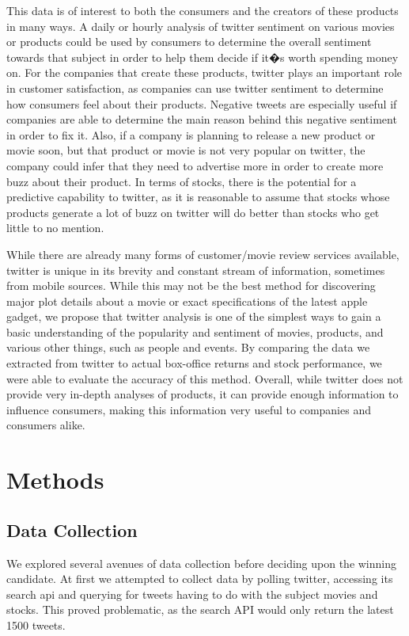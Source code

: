 \documentclass[11pt]{article}
\begin{document}
This data is of interest to both the consumers and the creators of these products in many ways.  A daily or hourly analysis of twitter sentiment on various movies or products could be used by consumers to determine the overall sentiment towards that subject in order to help them decide if it�s worth spending money on.  For the companies that create these products, twitter plays an important role in customer satisfaction, as companies can use twitter sentiment to determine how consumers feel about their products.  Negative tweets are especially useful if companies are able to determine the main reason behind this negative sentiment in order to fix it.  Also, if a company is planning to release a new product or movie soon, but that product or movie is not very popular on twitter, the company could infer that they need to advertise more in order to create more buzz about their product.  In terms of stocks, there is the potential for a predictive capability to twitter, as it is reasonable to assume that stocks whose products generate a lot of buzz on twitter will do better than stocks who get little to no mention.

While there are already many forms of customer/movie review services available, twitter is unique in its brevity and constant stream of information, sometimes from mobile sources.  While this may not be the best method for discovering major plot details about a movie or exact specifications of the latest apple gadget, we propose that twitter analysis is one of the simplest ways to gain a basic understanding of the popularity and sentiment of movies, products, and various other things, such as people and events.  By comparing the data we extracted from twitter to actual box-office returns and stock performance, we were able to evaluate the accuracy of this method.  Overall, while twitter does not provide very in-depth analyses of products, it can provide enough information to influence consumers, making this information very useful to companies and consumers alike.

\section{Methods}


\subsection{Data Collection}
We explored several avenues of data collection before deciding upon the winning candidate. At first we attempted to collect data by polling twitter, accessing its search api  and querying for tweets having to do with the subject movies and stocks. This proved problematic, as the search API would only return the latest 1500 tweets.
\end{document}
